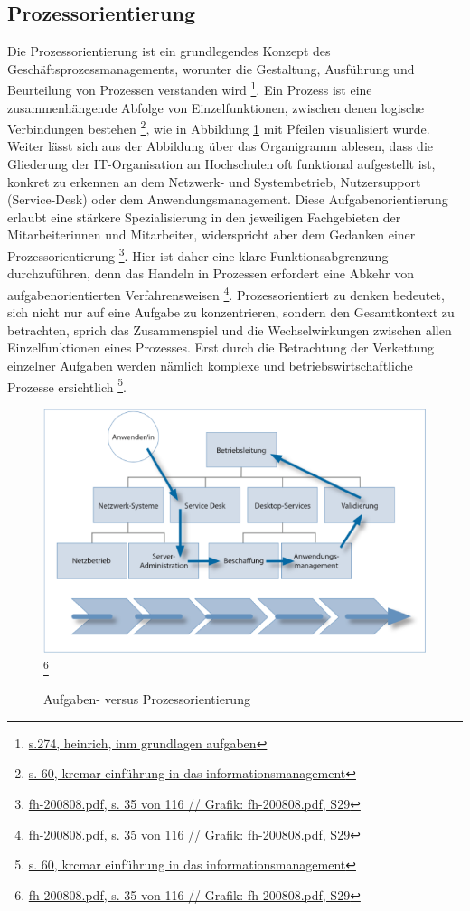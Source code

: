 \subsection{Prozessorientierung}
\label{subsection_prozessorientierung}
Die Prozessorientierung ist ein grundlegendes Konzept des Geschäftsprozessmanagements, worunter die Gestaltung, Ausführung und Beurteilung von Prozessen verstanden wird \footnote{\url{s.274, heinrich, inm grundlagen aufgaben}}. Ein Prozess ist eine zusammenhängende Abfolge von Einzelfunktionen, zwischen denen logische Verbindungen bestehen \footnote{\url{s. 60, krcmar einführung in das informationsmanagement}}, wie in Abbildung \ref{fig_aufgaben_vs_prozess} mit Pfeilen visualisiert wurde. Weiter lässt sich aus der Abbildung über das Organigramm ablesen, dass die Gliederung der IT-Organisation an Hochschulen oft funktional aufgestellt ist, konkret zu erkennen an dem Netzwerk- und Systembetrieb, Nutzersupport (Service-Desk) oder dem Anwendungsmanagement. Diese Aufgabenorientierung erlaubt eine stärkere Spezialisierung in den jeweiligen Fachgebieten der Mitarbeiterinnen und Mitarbeiter, widerspricht aber dem Gedanken einer Prozessorientierung \footnote{\url{fh-200808.pdf, s. 35 von 116 // Grafik: fh-200808.pdf, S29}}. Hier ist daher eine klare Funktionsabgrenzung durchzuführen, denn das Handeln in Prozessen erfordert eine Abkehr von aufgabenorientierten Verfahrensweisen \footnote{\url{fh-200808.pdf, s. 35 von 116 // Grafik: fh-200808.pdf, S29}}. Prozessorientiert zu denken bedeutet, sich nicht nur auf eine Aufgabe zu konzentrieren, sondern den Gesamtkontext zu betrachten, sprich das Zusammenspiel und die Wechselwirkungen zwischen allen Einzelfunktionen eines Prozesses. Erst durch die Betrachtung der Verkettung einzelner Aufgaben werden nämlich komplexe und betriebswirtschaftliche Prozesse ersichtlich \footnote{\url{s. 60, krcmar einführung in das informationsmanagement}}. 

\begin{figure}[h!]
	\centering
	\includegraphics[width=15cm]{kapitel/gruppe1_2/bilder/aufgaben-versus_prozessorientierung} 
	\footnote{\url{fh-200808.pdf, s. 35 von 116 // Grafik: fh-200808.pdf, S29}}
	\caption{Aufgaben- versus Prozessorientierung}
	\label{fig_aufgaben_vs_prozess}
\end{figure}


